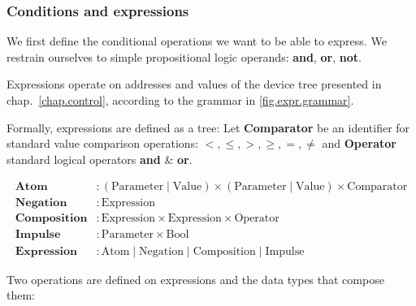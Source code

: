 \documentclass[applsci,article,submit,moreauthors,pdftex,10pt,a4paper]{mdpi}
\begin{document}
    
\subsubsection{Conditions and expressions}

We first define the conditional operations we want to be able to express.
We restrain ourselves to simple propositional logic operands: \textbf{and}, \textbf{or}, \textbf{not}.

Expressions operate on addresses and values of the device tree presented in chap.~\ref{chap.control}, according to the grammar in \ref{fig.expr.grammar}.

Formally, expressions are defined as a tree:
Let \textbf{Comparator} be an identifier for standard value comparison operations: $<, \leq, >, \geq, =, \neq$ and \textbf{Operator} standard logical operators \textbf{and} \&  \textbf{or}.

\begin{align*}
    \mathbf{Atom} & :  (\mathrm{Parameter} \mid \mathrm{Value}) \times (\mathrm{Parameter} \mid \mathrm{Value}) \times \mathrm{Comparator} \\
    \mathbf{Negation} & : \mathrm{Expression} \\
    \mathbf{Composition} & : \mathrm{Expression} \times \mathrm{Expression} \times \mathrm{Operator} \\
    \mathbf{Impulse} & : \mathrm{Parameter} \times \mathrm{Bool} \\
    \mathbf{Expression} &: \mathrm{Atom} \mid \mathrm{Negation} \mid \mathrm{Composition} \mid \mathrm{Impulse}
\end{align*}

Two operations are defined on expressions and the data types that compose them: 
\end{document}
